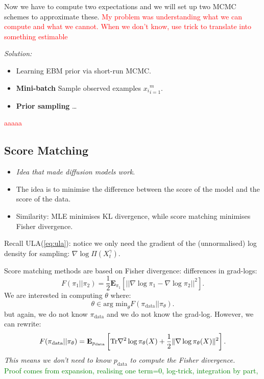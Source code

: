 \documentclass{article}
\DeclarePairedDelimiter{\norm}{\lVert}{\rVert}
\begin{document}
    Now we have to compute two expectations and we will set up two MCMC schemes to approximate these.
    \textcolor{red}{My problem was understanding what we can compute and what we cannot. When we don't know, use trick to translate into something estimable}

    \emph{Solution:}
    \begin{itemize}
        \item Learning EBM prior via short-run MCMC. 
        \item \textbf{Mini-batch} Sample observed examples ${x_i}_{i=1}^m$.
        \item \textbf{Prior sampling} \ldots
    \end{itemize}
    \textcolor{red}{aaaaa}

    \subsection{Score Matching}

    \begin{itemize}
        \item \textit{Idea that made diffusion models work}.
        \item The idea is to minimise the difference between the score of the model and the score of the data.
        \item Similarity: MLE minimises KL divergence, while score matching minimises Fisher divergence.
    \end{itemize}

    Recall ULA(\cref{eq:ula}): notice we only need the gradient of the (unnormalised) log density for sampling: $\nabla \log \Pi(X_t^\gamma)$.

    Score matching methods are based on Fisher divergence: differences in grad-logs:
    \begin{equation} \label{eq:}
        F(\pi_1 || \pi_2) = \frac{1}{2} \mathbf{E}_{\pi_1} [||\nabla \log \pi_1 - \nabla \log \pi_2||^2]. 
    \end{equation}
    We are interested in computing $\theta$ where:
    \begin{equation} \label{eq:}
      \theta \in \text{arg min}_\theta F(\pi_{\text{data}}|| \pi_{\theta} ).
    \end{equation}
    but again, we do not know $\pi_{\text{data}}$ and we do not know the grad-log.
    However, we can rewrite:
    \begin{equation} \label{eq:}
        F(\pi_{\text{data}}|| \pi_{\theta} ) = \mathbf{E}_{p_\text{data}} \left[ \text{Tr} \nabla^2 \log \pi_\theta(X) + \frac{1}{2} \norm{\nabla \log \pi_\theta(X)}^2 \right].
    \end{equation}
    \textit{This means we don't need to know $p_\text{data}$ to compute the Fisher divergence.}
    \\
    \textcolor{green}{Proof comes from expansion, realising one term=0, log-trick, integration by part, }
\end{document}
